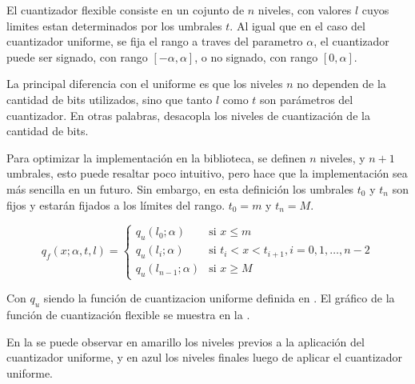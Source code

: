 El cuantizador flexible consiste en un cojunto de $n$ niveles, con valores $l$ cuyos limites estan determinados por los umbrales $t$. Al igual que en el caso del cuantizador uniforme, se fija el rango a traves del parametro $\alpha$, el cuantizador puede ser signado, con rango $[-\alpha, \alpha]$, o no signado, con rango $[0, \alpha]$.

La principal diferencia con el uniforme es que los niveles $n$ no dependen de la cantidad de bits utilizados, sino que tanto $l$ como $t$ son parámetros del cuantizador. En otras palabras, desacopla los niveles de cuantización de la cantidad de bits.

Para optimizar la implementación en la biblioteca, se definen $n$ niveles, y $n+1$ umbrales, esto puede resaltar poco intuitivo, pero hace que la implementación sea más sencilla en un futuro. Sin embargo, en esta definición los umbrales $t_0$ y $t_n$ son fijos y estarán fijados a los límites del rango. $t_0 = m$ y $t_n = M$.


\begin{equation}
    \label{eq:flexible_quantizer}
    q_{f}\left(x; \alpha, t, l\right) =
    \begin{cases}
        q_{u}\left(l_{0}; \alpha\right)& \text{si $x \leq m$} \\
        q_{u}\left(l_{i}; \alpha\right) & \text{si } t_i < x < t_{i+1}, i = 0, 1, \ldots, n-2 \\
        q_{u}\left(l_{n-1}; \alpha\right) & \text{si } x \geq M
    \end{cases}
\end{equation}

Con $q_u$ siendo la función de cuantizacion uniforme definida en . El gráfico de la función de cuantización flexible se muestra en la .



En la  se puede observar en amarillo los niveles previos a la aplicación del cuantizador uniforme, y en azul los niveles finales luego de aplicar el cuantizador uniforme.



